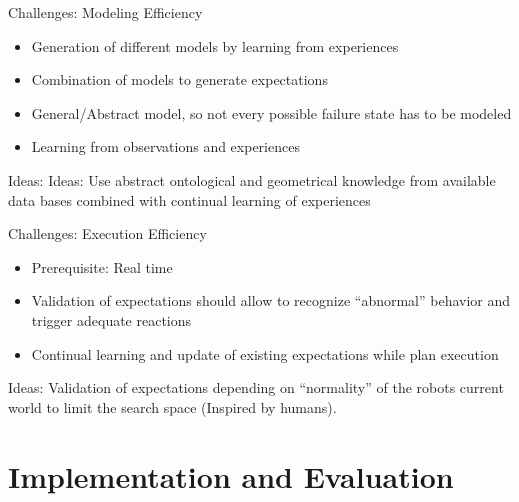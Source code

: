 \documentclass{beamer}
\begin{document}
\label{sec:model}

\begin{frame}{Challenges: Modeling Efficiency}
  \begin{itemize}
  \item Generation of different models by learning from experiences
  \item Combination of models to generate expectations
  \item General/Abstract model, so not every possible failure state has to be modeled
  \item Learning from observations and experiences
  \end{itemize}
  \begin{block}{Ideas:}
  Ideas: Use abstract ontological and geometrical knowledge from available data bases combined with continual learning of experiences
  \end{block}
\end{frame}

\label{sec:execution}

\begin{frame}{Challenges: Execution Efficiency}
  \begin{itemize}
  \item Prerequisite: Real time
  \item Validation of expectations should allow to recognize ``abnormal'' behavior and trigger adequate reactions
  \item Continual learning and update of existing expectations while plan execution
  \end{itemize}
  \begin{block}{Ideas:}
    Validation of expectations depending on ``normality'' of the robots current world to limit the search space (Inspired by humans).
  \end{block}
\end{frame}

\section{Implementation and Evaluation}
\end{document}
